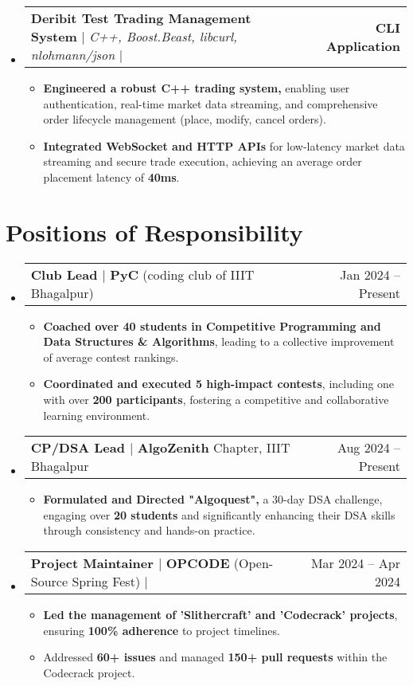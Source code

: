 \documentclass[letterpaper,11pt]{article}
\makeatletter
\newcommand{\resumePOR}[3]{
\vspace{0.5mm}\item
    \begin{tabular*}{0.97\textwidth}[t]{l@{\extracolsep{\fill}}r}
        \textbf{#1}\hspace{0.3mm}#2 & \small{#3} 
    \end{tabular*}
    \vspace{-3mm}
}
\newcommand{\resumeProjectHeading}[2]{
    \item
    \begin{tabular*}{1.001\textwidth}{l@{\extracolsep{\fill}}r}
      \small#1 & \textbf{\small #2}\\
    \end{tabular*}\vspace{-7pt}
}
\newcommand{\resumeSubHeadingListStart}{\begin{itemize}[leftmargin=0.0in, label={}]}
\newcommand{\resumeSubHeadingListEnd}{\end{itemize}}
\newcommand{\resumeItemListStart}{\begin{itemize}}
\newcommand{\resumeItemListEnd}{\end{itemize}\vspace{-15pt}}
\makeatother
\begin{document}
    \vspace{-8pt}
    \resumeSubHeadingListStart
    \resumeProjectHeading
      {\textbf{\large Deribit Test Trading Management System} $|$ \emph{C++, Boost.Beast, libcurl, nlohmann/json} $|$ \emph{\color{Blue} \href{https://github.com/sanghaibiraj/DeribitTest_TradeManagementSystem}\faGithub{}}}{CLI Application}
      \vspace{-16pt}
      \resumeItemListStart
        \item \textbf{Engineered a robust C++ trading system,} enabling user authentication, real-time market data streaming, and comprehensive order lifecycle management (place, modify, cancel orders). 
        \vspace{-4pt}
        \item \textbf{Integrated WebSocket and HTTP APIs} for low-latency market data streaming and secure trade execution, achieving an average order placement latency of \textbf{40ms}.
      \resumeItemListEnd
    \vspace{-10pt}
\resumeSubHeadingListEnd

\vspace{8pt}

\section{\textbf{Positions of Responsibility}}
\resumeSubHeadingListStart
\resumePOR{Club Lead $|$ }{\textbf{PyC }(coding club of IIIT Bhagalpur)}{Jan 2024 -- Present}
    \resumeItemListStart
        \item \textbf{Coached over 40 students in Competitive Programming and Data Structures \& Algorithms}, leading to a collective improvement of average contest rankings.
        \vspace{-4pt}
        \item \textbf{Coordinated and executed 5 high-impact contests}, including one with over \textbf{200 participants}, fostering a competitive and collaborative learning environment.
    \resumeItemListEnd
\vspace{4pt}
\resumePOR{CP/DSA Lead $|$ }{\textbf{AlgoZenith} Chapter, IIIT Bhagalpur}{Aug 2024 -- Present}
    \resumeItemListStart
        \item \textbf{Formulated and Directed "Algoquest",} a 30-day DSA challenge, engaging over \textbf{20 students} and significantly enhancing their DSA skills through consistency and hands-on practice.
    \resumeItemListEnd
\vspace{4pt}
\resumePOR{Project Maintainer $|$ }{\textbf{OPCODE} (Open-Source Spring Fest) $|$ \color{Blue} \href{https://drive.google.com/file/d/1bFdeC9lv0cpDgV0IQ5HacyyKJtViQ6rH/view?usp=sharing}\faCertificate{} }{Mar 2024 -- Apr 2024}
    \resumeItemListStart
        \item \textbf{Led the management of 'Slithercraft' and 'Codecrack' projects}, ensuring \textbf{100\% adherence} to project timelines.
        \vspace{-4pt}
        \item Addressed \textbf{60+ issues} and managed \textbf{150+ pull requests} within the Codecrack project.
    \resumeItemListEnd
\resumeSubHeadingListEnd
\end{document}

